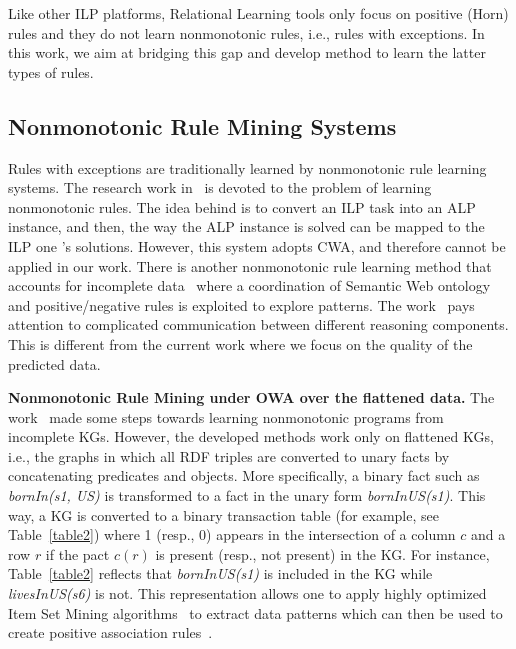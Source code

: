 Like other ILP platforms, Relational Learning tools only focus on positive (Horn) rules and they do not learn nonmonotonic rules, i.e., rules with exceptions. In this work, we aim at bridging this gap and develop method to learn the latter types of rules.

\subsection{Nonmonotonic Rule Mining Systems}
\label{related-work-nonmonotonic-rule-mining-systems}

Rules with exceptions are traditionally learned by nonmonotonic rule learning systems. The research work in~\cite{ref32} is devoted to the problem of learning nonmonotonic rules. The idea behind is to convert an ILP task into an ALP~\cite{ref31} instance, and then, the way the ALP instance is solved can be mapped to the ILP one 's solutions. However, this system adopts CWA, and therefore cannot be applied in our work. There is another nonmonotonic rule learning method that accounts for incomplete data~\cite{ref34} where a coordination of Semantic Web ontology and positive/negative rules is exploited to explore patterns. The work~\cite{ref34} pays attention to complicated communication between different reasoning components. This is different from the current work where we focus on the quality of the predicted data.

\textbf{Nonmonotonic Rule Mining under OWA over the flattened data.} The work~\cite{ref12} made some steps towards learning nonmonotonic programs from incomplete KGs. However, the developed methods work only on flattened KGs, i.e., the graphs in which all RDF triples are converted to unary facts by concatenating predicates and objects. More specifically, a binary fact such as \textit{bornIn(s1, US)} is transformed to a fact in the unary form \textit{bornInUS(s1)}. This way, a KG is converted to a binary transaction table (for example, see Table~\ref{table2}) where 1 (resp., 0) appears in the intersection of a column $c$ and a row $r$ if the pact $c(r)$ is present (resp., not present) in the KG. For instance, Table~\ref{table2} reflects that \textit{bornInUS(s1)} is included in the KG while \textit{livesInUS(s6)} is not. This representation allows one to apply highly optimized Item Set Mining algorithms~\cite{ref37} to extract data patterns which can then be used to create positive association rules~\cite{ref13}.

